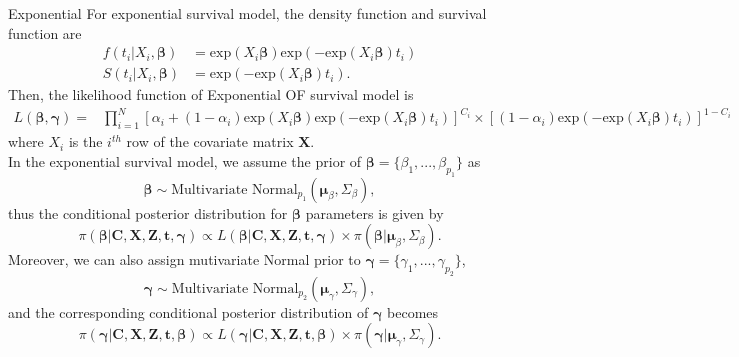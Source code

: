 \documentclass[a4paper, 12pt]{article}
\makeatletter
\newcommand {\dprod}{\displaystyle \prod}
\renewcommand{\subsection}{\@startsection
	{subsection}    {2}    {0mm}    {-0.5\baselineskip}    {0.01\baselineskip}    {\normalfont\normalsize\itshape\center}}
\makeatother
\begin{document}
\subsection{Exponential}
\noindent 
For exponential survival model, the density function and survival function are
\begin{equation}
\begin{aligned}
f(t_i|X_i, \mathbf{\beta}) &= \mbox{exp}(X_i\mathbf{\beta})\mbox{exp}(- \mbox{exp}(X_i\mathbf{\beta})t_i)\\
S(t_i|X_i, \mathbf{\beta}) &= \mbox{exp}(- \mbox{exp}(X_i\mathbf{\beta})t_i).
\end{aligned}
\end{equation}
Then, the likelihood function of Exponential OF survival model is
\begin{equation}
\begin{aligned}
L(\mathbf{\beta}, \mathbf{\gamma})=&\dprod\limits_{i=1}^{N}[\alpha _{i}+(1-\alpha _{i})\mbox{exp}(X_i\mathbf{\beta})\mbox{exp}(- \mbox{exp}(X_i\mathbf{\beta})t_i)]^{C_{i}} \times[(1-\alpha _{i})\mbox{exp}(- \mbox{exp}(X_i\mathbf{\beta})t_i)]^{1-C_{i}}
\end{aligned}
\end{equation}
where $X_i$ is the $i^{th}$ row of the covariate matrix $\mathbf{X}$.\\ \newline
In the exponential survival model, we assume the prior of $\mathbf{\beta}=\{\beta_1,...,\beta_{p_1}\}$ as
\begin{equation}
\mathbf{\beta} \sim \mbox{Multivariate Normal}_{p_1}(\mathbf{\mu}_{\beta}, \Sigma_{\beta}),
\end{equation}
thus the conditional posterior distribution for $\mathbf{\beta}$ parameters is given by
\begin{equation}
\pi(\mathbf{\beta}|\mathbf{C}, \mathbf{X}, \mathbf{Z}, \mathbf{t}, \mathbf{\gamma}) \propto L(\mathbf{\beta}|\mathbf{C}, \mathbf{X}, \mathbf{Z}, \mathbf{t}, \mathbf{\gamma})\times \pi(\mathbf{\beta}|\mathbf{\mu}_{\beta}, \Sigma_{\beta}).
\end{equation}
Moreover, we can also assign mutivariate Normal prior to $\mathbf{\gamma}=\{\gamma_1,...,\gamma_{p_2}\}$,
\begin{equation}
\mathbf{\gamma} \sim \mbox{Multivariate Normal}_{p_2}(\mathbf{\mu}_{\gamma}, \Sigma_{\gamma}),
\end{equation}
and the corresponding conditional posterior distribution of $\mathbf{\gamma}$ becomes 
\begin{equation}
\pi(\mathbf{\gamma}|\mathbf{C}, \mathbf{X}, \mathbf{Z}, \mathbf{t}, \mathbf{\beta}) \propto L(\mathbf{\gamma}|\mathbf{C}, \mathbf{X}, \mathbf{Z}, \mathbf{t}, \mathbf{\beta})\times \pi(\mathbf{\gamma}|\mathbf{\mu}_{\gamma}, \Sigma_{\gamma}).
\end{equation}
\end{document}
